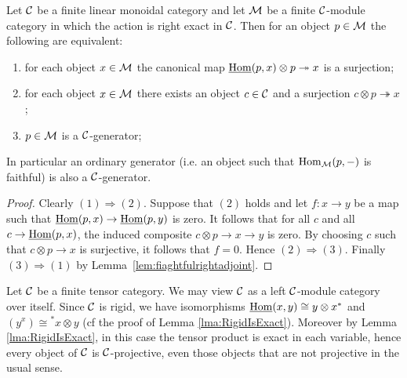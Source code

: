 \documentclass{amsart}
\begin{document}
\begin{lemma}\label{lem:gen}
	Let $\mathcal C$ be a finite linear monoidal category and let $\mathcal M$ be a finite $\mathcal C$-module category in which the action is right exact in $\mathcal C$. Then for an object $p \in \mathcal M$ the following are equivalent:
	\begin{enumerate}
		\item for each object $x \in \mathcal M$ the canonical map $\operatorname{\underline{Hom}}(p,x) \otimes p \twoheadrightarrow x$ is a surjection;
		\item for each object $x \in \mathcal M$ there exists an object $c \in \mathcal C$ and a surjection $c \otimes p \twoheadrightarrow x$;
		\item $p \in \mathcal M$ is a $\mathcal C$-generator;
	\end{enumerate}
	In particular an ordinary generator (i.e. an object such that $\operatorname{Hom}_\mathcal M(p,-)$ is faithful) is also a $\mathcal C$-generator.
\end{lemma}
\begin{proof}
	Clearly $(1) \Rightarrow (2)$. Suppose that $(2)$ holds and let $f: x \to y$ be a map such that $\operatorname{\underline{Hom}}(p, x) \to \operatorname{\underline{Hom}}(p,y)$ is zero. It follows that for all $c$ and all $c \to \operatorname{\underline{Hom}}(p,x)$, the induced composite $c \otimes p \to x \to y$ is zero. By choosing $c$ such that $c \otimes p \to x$ is surjective, it follows that $f=0$. Hence $(2) \Rightarrow (3)$. Finally $(3) \Rightarrow (1)$ by Lemma~\ref{lem:fiaghtfulrightadjoint}.
\end{proof}


\begin{example} \label{ex:rigid_all_C-proj}
	Let $\mathcal C$ be a finite tensor category. We may view $\mathcal C$ as a left $\mathcal C$-module category over itself. Since $\mathcal C$ is rigid, we have isomorphisms $\operatorname{\underline{Hom}}(x,y) \cong y \otimes x^*$ and $(y^x) \cong {}^*x \otimes y$ (cf the proof of Lemma \ref{lma:RigidIsExact}). Moreover by Lemma \ref{lma:RigidIsExact}, in this case the tensor product is exact in each variable, hence every object of $\mathcal C$ is $\mathcal C$-projective, even those objects that are not projective in the usual sense. %
\end{example}
\end{document}

